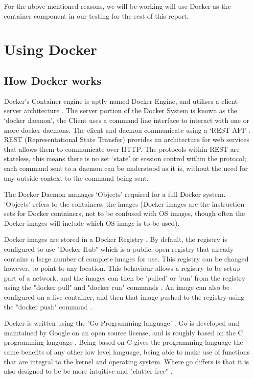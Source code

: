 For the above mentioned reasons, we will be working will use Docker as the container component in our testing for the rest of this report.

\section{Using Docker}
\subsection{How Docker works}
\label{subsec:docker}
Docker's Container engine is aptly named Docker Engine, and utilises a client-server architecture \citep[Section: Docker architecture]{DockerOverview}. The server portion of the Docker System is known as the `docker daemon', the Client uses a command line interface to interact with one or more docker daemons. The client and daemon communicate using a `REST API' \citep[Section: The Docker daemon]{DockerOverview}. REST (Representational State Transfer) provides an architecture for web services \citep{W3Architecture2004} that allows them to communicate over HTTP. The protocols within REST are stateless, this means there is no set `state' or session control within the protocol; each command sent to a daemon can be understood as it is, without the need for any outside context to the command being sent.

The Docker Daemon manages `Objects' \citep[Section: Docker objects]{DockerOverview} required for a full Docker system. 'Objects' refers to the containers, the images (Docker images are the instruction sets for Docker containers, not to be confused with OS images, though often the Docker images will include which OS image is to be used).

Docker images are stored in a Docker Registry \citep[Section: Docker registries]{DockerOverview}. By default, the registry is configured to use "Docker Hub" which is a public, open registry that already contains a large number of complete images for use. This registry can be changed however, to point to any location. This behaviour allows a registry to be setup part of a network, and the images can then be 'pulled' or 'run' from the registry using the "docker pull" and "docker run" commands \citep[Section: Docker registries]{DockerOverview}. An image can also be configured on a live container, and then that image pushed to the registry using the "docker push" command \citep[Section: Docker registries]{DockerOverview}.

Docker is written using the 'Go Programming language' \citep[Section: The underlying technology]{DockerOverview}. Go is developed and maintained by Google on an open source license, and is roughly based on the C programming language \citep{GoAncestors}. Being based on C gives the programming language the same benefits of any other low level language, being able to make use of functions that are integral to the kernel and operating system. Where go differs is that it is also designed to be be more intuitive and "clutter free" \citep{GoPrinciples}.

